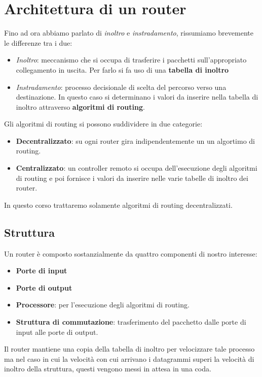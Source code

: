 \section{Architettura di un router}
Fino ad ora abbiamo parlato di \emph{inoltro} e \emph{instradamento},
rissumiamo brevemente le differenze tra i due:
\begin{itemize}
	\item \emph{Inoltro}: meccanismo che si occupa di trasferire i
		pacchetti sull'appropriato collegamento in uscita. Per farlo
		si fa uso di una \textbf{tabella di inoltro}
	\item \emph{Instradamento}: processo decisionale di scelta del
		percorso verso una destinazione. In questo caso si determinano
		i valori da inserire nella tabella di inoltro attraverso 
		\textbf{algoritmi di routing}.
\end{itemize}
Gli algoritmi di routing si possono suddividere in due categorie:
\begin{itemize}
	\item \textbf{Decentralizzato}: su ogni router gira 
		indipendentemente un un algortimo di routing.
	\item \textbf{Centralizzato}: un controller remoto si occupa
		dell'esecuzione degli algoritmi di routing e poi fornisce i 
		valori da inserire nelle varie tabelle di inoltro dei router.
\end{itemize}
In questo corso trattaremo solamente algoritmi di routing 
decentralizzati.

\subsection{Struttura}
Un router è composto sostanzialmente da quattro componenti di nostro
interesse:
\begin{itemize}
	\item \textbf{Porte di input}
	\item \textbf{Porte di output}
	\item \textbf{Processore}: per l'esecuzione degli algoritmi di
		routing.
	\item \textbf{Struttura di commutazione}: trasferimento del 
		pacchetto dalle porte di input alle porte di output.
\end{itemize}
Il router mantiene una copia della tabella di inoltro per velocizzare
tale processo ma nel caso in cui la velocità con cui arrivano i 
datagrammi superi la velocità di inoltro della struttura, questi
vengono messi in attesa in una coda.

